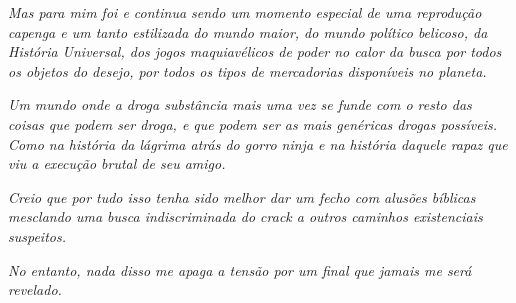 \emph{Mas para mim foi e continua sendo um momento especial de uma
reprodução capenga e um tanto estilizada do mundo maior, do mundo
político belicoso, da História Universal, dos jogos maquiavélicos de
poder no calor da busca por todos os objetos do desejo, por todos os
tipos de mercadorias disponíveis no planeta.}~

\emph{Um mundo onde a droga substância mais uma vez se funde com o resto
das coisas que podem ser droga, e que podem ser as mais genéricas drogas
possíveis. Como na história da lágrima atrás do gorro ninja e na história
daquele rapaz que viu a execução brutal de seu amigo.}~

\emph{Creio que por tudo isso tenha sido melhor dar um fecho com alusões
bíblicas mesclando uma busca indiscriminada do crack a outros caminhos
existenciais suspeitos.}~

\emph{No entanto, nada disso me apaga a tensão por um final que jamais
me será revelado.~}
\endgroup